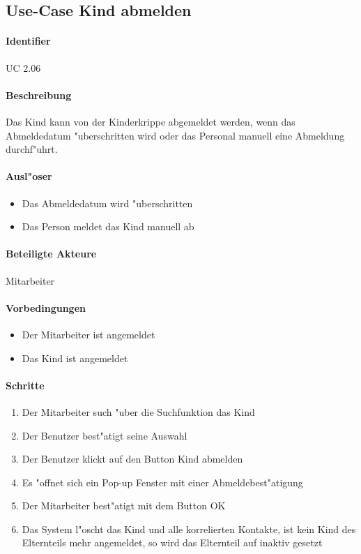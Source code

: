   \newpage
 \subsection{Use-Case Kind abmelden}
  \paragraph{Identifier}
  UC 2.06
  \paragraph{Beschreibung}
  Das Kind kann von der Kinderkrippe abgemeldet werden, wenn das Abmeldedatum "uberschritten wird oder das Personal manuell eine Abmeldung durchf"uhrt.
  \paragraph{Ausl"oser}
  \begin{itemize}
   \item Das Abmeldedatum wird "uberschritten
   \item Das Person meldet das Kind manuell ab
  \end{itemize}

  \paragraph{Beteiligte Akteure}   \leavevmode \newline
    Mitarbeiter
  \paragraph{Vorbedingungen}
  \begin{itemize}
   \item Der Mitarbeiter ist angemeldet
   \item Das Kind ist angemeldet
  \end{itemize}

  \paragraph{Schritte}
  \begin{enumerate}
   \item Der Mitarbeiter such "uber die Suchfunktion das Kind
   \item Der Benutzer best"atigt seine Auswahl
   \item Der Benutzer klickt auf den Button \dq Kind abmelden\dq
   \item Es "offnet sich ein Pop-up Fenster mit einer Abmeldebest"atigung
   \item Der Mitarbeiter best"atigt mit dem Button \dq OK\dq
   \item Das System l"oscht das Kind und alle korrelierten Kontakte, ist kein Kind des Elternteils mehr angemeldet, so wird das Elternteil auf inaktiv gesetzt
  \end{enumerate}

